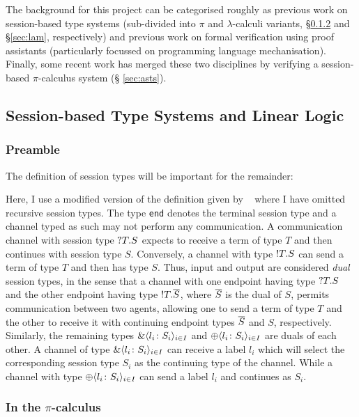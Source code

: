\documentclass{mpaper}
\begin{document}
The background for this project can be categorised roughly as previous work on
session-based type systems (sub-divided into $\pi$ and $\lambda$-calculi
variants, \S \ref{sec:pis} and \S \ref{sec:lam}, respectively) and previous
work on formal verification using proof assistants (particularly focussed on
programming language mechanisation). Finally, some recent work has merged
these two disciplines by verifying a session-based $\pi$-calculus system (\S
\ref{sec:asts}).

\subsection{Session-based Type Systems and Linear Logic}\label{sec:sts}

\subsubsection{Preamble}\label{sec:pre}

The definition of session types will be important for the remainder:


Here, I use a modified version of the definition given by
\citeauthor{Gay:2010:LAST}~\cite{Gay:2010:LAST} where I have omitted recursive
session types. The type \lstinline{end} denotes the terminal session type and
a channel typed as such may not perform any communication. A communication
channel with session type $?{T}.{S}$ expects to receive a term of type $T$
and then continues with session type $S$. Conversely, a channel with type
$!{T}.{S}$ can send a term of type $T$ and then has type $S$. Thus, input
and output are considered \emph{dual} session types, in the sense that a
channel with one endpoint having type $?{T}.{S}$ and the other endpoint
having type $!{T}.{\overline{{S}}}$, where $\overline{{S}}$ is the dual of $S$,
permits communication between two agents, allowing one to send a term of type
$T$ and the other to receive it with continuing endpoint types $\overline{{S}}$ and
$S$, respectively. Similarly, the remaining types $\&\langle{l_i}\colon{S_i}\rangle_{i\in I}$
and $\oplus\langle{l_i}\colon{S_i}\rangle_{i\in I}$ are duals of each other. A channel of type
$\&\langle{l_i}\colon{S_i}\rangle_{i\in I}$ can receive a label $l_i$ which will select the
corresponding session type $S_i$ as the continuing type of the channel. While
a channel with type $\oplus\langle{l_i}\colon{S_i}\rangle_{i\in I}$ can send a label $l_i$ and
continues as $S_i$.

\subsubsection{In the \texorpdfstring{$\pi$}{pi}-calculus}\label{sec:pis}
\end{document}
